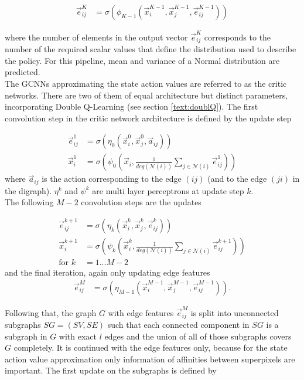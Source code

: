 \begin{align}
\vec{e}_{ij}^{K} &= \sigma \left( \phi_{K-1} \left(\vec{x}_i^{K-1}, \vec{x}_j^{K-1}, \vec{e}_{ij}^{K-1} \right)\right)
\end{align}

where the number of elements in the output vector $\vec{e}_{ij}^K$ corresponds to the number of the required scalar values that define the distribution used to describe the policy. For this pipeline, mean and variance of a Normal distribution are predicted.\\

The GCNNs approximating the state action values are referred to as the critic networks. There are two of them of equal architecture but distinct parameters, incorporating Double Q-Learning (see section \ref{text:doublQ}). The first convolution step in the critic network architecture is defined by the update step

\begin{align}
\vec{e}_{ij}^1 &= \sigma \left( \eta_0 \left(\vec{x}_i^0, \vec{x}_j^0, \vec{a}_{ij} \right)\right)\\
\vec{x}_i^1 &= \sigma \left( \psi_0 \left(\vec{x}_i, \frac{1}{deg(\mathcal{N}(i))} \sum_{j \in \mathcal{N}(i)}  \vec{e}_{ij}^1 \right)\right)
\end{align}
where $\vec{a}_{ij}$ is the action corresponding to the edge $(ij)$ (and to the edge $(ji)$ in the digraph). $\eta^k$ and $\psi^k$
are multi layer perceptrons at update step $k$.\\
The following $M-2$ convolution steps are the updates

\begin{align}
\vec{e}_{ij}^{k+1} &= \sigma \left( \eta_k \left(\vec{x}_i^k, \vec{x}_j^k, \vec{e}_{ij}^k \right)\right)\\
\vec{x}_i^{k+1} &= \sigma \left( \psi_k \left(\vec{x}_i^k, \frac{1}{deg(\mathcal{N}(i))} \sum_{j \in \mathcal{N}(i)}  \vec{e}_{ij}^{k+1} \right)\right)\\
\text{for }k&=1...M-2
\end{align}
and the final iteration, again only updating edge features
\begin{align}
\vec{e}_{ij}^M &= \sigma \left( \eta_{M-1} \left(\vec{x}_i^{M-1}, \vec{x}_j^{M-1}, \vec{e}_{ij}^{M-1} \right)\right) .
\end{align}

Following that, the graph $G$ with edge features $\vec{e}_{ij}^M$ is split into unconnected subgraphs $SG=(SV,SE)$ such that each connected component in $SG$ is a subgraph in $G$ with exact $l$ edges and the union of all of those subgraphs covers $G$ completely. It is continued with the edge features only, because for the state action value approximation only information of affinities between superpixels are important. The first update on the subgraphs is defined by

